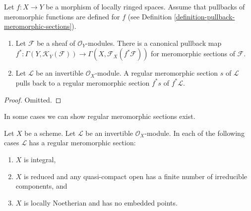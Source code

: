 \begin{lemma}
\label{lemma-meromorphic-sections-pullback}
Let $f : X \to Y$ be a morphism of locally ringed spaces.
Assume that pullbacks of meromorphic functions are defined
for $f$ (see
Definition \ref{definition-pullback-meromorphic-sections}).
\begin{enumerate}
\item Let $\mathcal{F}$ be a sheaf of $\mathcal{O}_Y$-modules.
There is a canonical pullback map
$f^* : \Gamma(Y, \mathcal{K}_Y(\mathcal{F})) \to
\Gamma(X, \mathcal{F}_X(f^*\mathcal{F}))$
for meromorphic sections of $\mathcal{F}$.
\item Let $\mathcal{L}$ be an invertible $\mathcal{O}_X$-module.
A regular meromorphic section $s$ of $\mathcal{L}$ pulls back
to a regular meromorphic section $f^*s$ of $f^*\mathcal{L}$.
\end{enumerate}
\end{lemma}

\begin{proof}
Omitted. 
\end{proof}

\noindent
In some cases we can show regular meromorphic sections exist.

\begin{lemma}
\label{lemma-regular-meromorphic-section-exists}
Let $X$ be a scheme.
Let $\mathcal{L}$ be an invertible $\mathcal{O}_X$-module.
In each of the following cases $\mathcal{L}$ has a regular meromorphic
section:
\begin{enumerate}
\item $X$ is integral,
\item $X$ is reduced and any quasi-compact open has a finite
number of irreducible components, and
\item $X$ is locally Noetherian and has no embedded points.
\end{enumerate}
\end{lemma}


